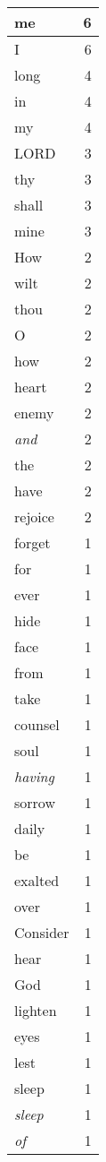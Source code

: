 \begin{center}
\begin{longtable}{l|r}
\hline \hline
\endlastfoot
me & 6 \\ \hline
I & 6 \\ \hline
long & 4 \\ \hline
in & 4 \\ \hline
my & 4 \\ \hline
LORD & 3 \\ \hline
thy & 3 \\ \hline
shall & 3 \\ \hline
mine & 3 \\ \hline
How & 2 \\ \hline
wilt & 2 \\ \hline
thou & 2 \\ \hline
O & 2 \\ \hline
how & 2 \\ \hline
heart & 2 \\ \hline
enemy & 2 \\ \hline
\emph{and} & 2 \\ \hline
the & 2 \\ \hline
have & 2 \\ \hline
rejoice & 2 \\ \hline
forget & 1 \\ \hline
for & 1 \\ \hline
ever & 1 \\ \hline
hide & 1 \\ \hline
face & 1 \\ \hline
from & 1 \\ \hline
take & 1 \\ \hline
counsel & 1 \\ \hline
soul & 1 \\ \hline
\emph{having} & 1 \\ \hline
sorrow & 1 \\ \hline
daily & 1 \\ \hline
be & 1 \\ \hline
exalted & 1 \\ \hline
over & 1 \\ \hline
Consider & 1 \\ \hline
hear & 1 \\ \hline
God & 1 \\ \hline
lighten & 1 \\ \hline
eyes & 1 \\ \hline
lest & 1 \\ \hline
sleep & 1 \\ \hline
\emph{sleep} & 1 \\ \hline
\emph{of} & 1 \\ \hline

\end{longtable}
\end{center}
